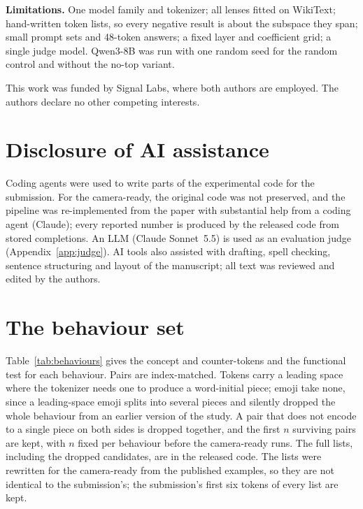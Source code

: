 \documentclass{article}
\begin{document}
\textbf{Limitations.} One model family and tokenizer; all lenses fitted on WikiText; hand-written token lists, so every negative result is about the subspace they span; small prompt sets and 48-token answers; a fixed layer and coefficient grid; a single judge model. Qwen3-8B was run with one random seed for the random control and without the no-top variant.

\begin{ack}
This work was funded by Signal Labs, where both authors are employed. The authors declare no other competing interests.
\end{ack}

\section*{Disclosure of AI assistance}

Coding agents were used to write parts of the experimental code for the submission. For the camera-ready, the original code was not preserved, and the pipeline was re-implemented from the paper with substantial help from a coding agent (Claude); every reported number is produced by the released code from stored completions. An LLM (Claude Sonnet~5.5) is used as an evaluation judge (Appendix~\ref{app:judge}). AI tools also assisted with drafting, spell checking, sentence structuring and layout of the manuscript; all text was reviewed and edited by the authors.




\appendix

\section{The behaviour set}
\label{app:behaviours}

Table~\ref{tab:behaviours} gives the concept and counter-tokens and the functional test for each behaviour. Pairs are index-matched. Tokens carry a leading space where the tokenizer needs one to produce a word-initial piece; emoji take none, since a leading-space emoji splits into several pieces and silently dropped the whole behaviour from an earlier version of the study. A pair that does not encode to a single piece on both sides is dropped together, and the first $n$ surviving pairs are kept, with $n$ fixed per behaviour before the camera-ready runs. The full lists, including the dropped candidates, are in the released code. The lists were rewritten for the camera-ready from the published examples, so they are not identical to the submission's; the submission's first six tokens of every list are kept.
\end{document}
